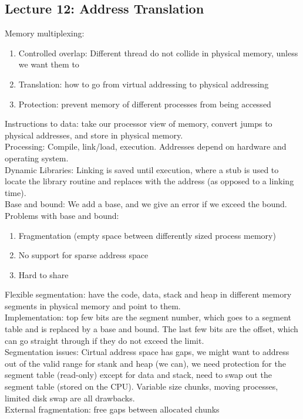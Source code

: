 \documentclass[paper=a4, fontsize=11pt]{scrartcl} %
\numberwithin{equation}{section} %
\numberwithin{figure}{section} %
\numberwithin{table}{section} %
\begin{document}
\subsection{Lecture 12: Address Translation}
Memory multiplexing:
\begin{enumerate}
	\item Controlled overlap: Different thread do not collide in physical memory, unless we want them to
    \item Translation: how to go from virtual addressing to physical addressing
    \item Protection: prevent memory of different processes from being accessed
\end{enumerate}
Instructions to data: take our processor view of memory, convert jumps to physical addresses, and store in physical memory. \\
Processing: Compile, link/load, execution. Addresses depend on hardware and operating system. \\
Dynamic Libraries: Linking is saved until execution, where a stub is used to locate the library routine and replaces with the address (as opposed to a linking time). \\
Base and bound: We add a base, and we give an error if we exceed the bound. \\
Problems with base and bound: 
\begin{enumerate}
	\item Fragmentation (empty space between differently sized process memory)
    \item No support for sparse address space
    \item Hard to share
\end{enumerate}
Flexible segmentation: have the code, data, stack and heap in different memory segments in physical memory and point to them.\\
Implementation: top few bits are the segment number, which goes to a segment table and is replaced by a base and bound. The last few bits are the offset, which can go straight through if they do not exceed the limit. \\
Segmentation issues: Cirtual address space has gaps, we might want to address out of the valid range for stank and heap (we can), we need protection for the segment table (read-only) except for data and stack, need to swap out the segment table (stored on the CPU). Variable size chunks, moving processes, limited disk swap are all drawbacks.\\
External fragmentation: free gaps between allocated chunks\\
\end{document}
